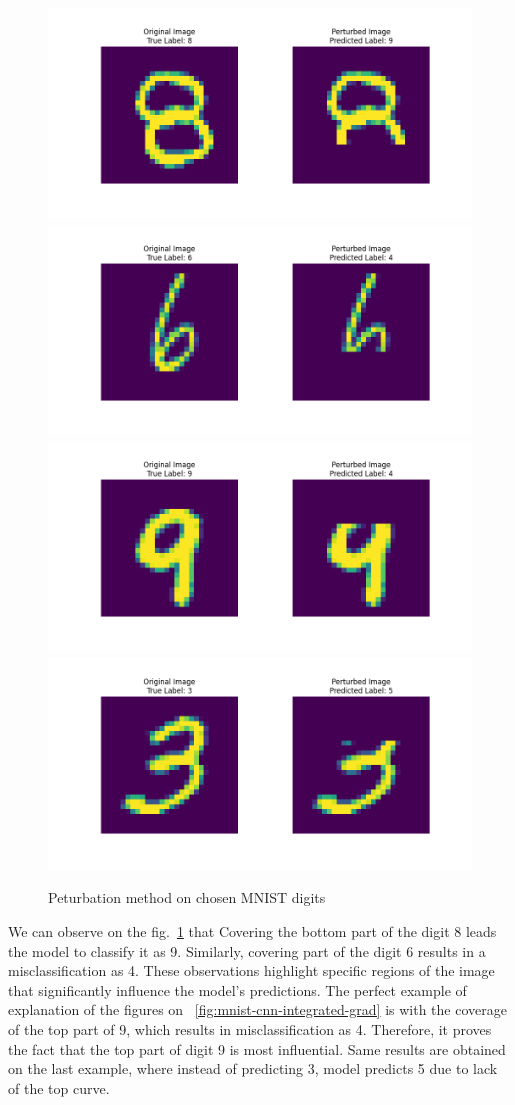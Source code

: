 \documentclass[journal, a4paper]{IEEEtran}
\begin{document}
\begin{figure}[ht]\centering
    \includegraphics[width=.6\linewidth]{img/counterfacts/MNIST/cover_bottom/img_1}
    \includegraphics[width=.6\linewidth]{img/counterfacts/MNIST/cover_bottom/img_3}
    \includegraphics[width=.6\linewidth]{img/counterfacts/MNIST/cover_top/img_10}
    \includegraphics[width=.6\linewidth]{img/counterfacts/MNIST/cover_top/img_3}
    \caption{Peturbation method on chosen MNIST digits}\label{fig:mnist-cnn-counterfacts}
\end{figure}

We can observe on the fig.~\ref{fig:mnist-cnn-counterfacts} that Covering the bottom part of the digit 8 leads the model to classify it as 9.
Similarly, covering part of the digit 6 results in a misclassification as 4.
These observations highlight specific regions of the image that significantly influence the model's predictions.
The perfect example of explanation of the figures on ~\ref{fig:mnist-cnn-integrated-grad} is with the coverage of the top part of 9, which results in misclassification as 4.
Therefore, it proves the fact that the top part of digit 9 is most influential.
Same results are obtained on the last example, where instead of predicting 3, model predicts 5 due to lack of the top curve.
\end{document}
